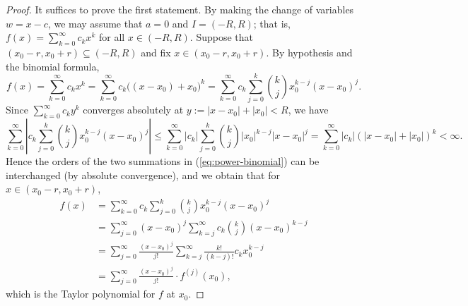 \documentclass[11pt]{article}
\begin{document}
\begin{proof}
  It suffices to prove the first statement.
  By making the change of variables $w = x - c$, we may assume that $a = 0$ and $I = (-R, R)$; that is, $\displaystyle f(x) = \sum_{k=0}^\infty c_k x^k$ for all $x \in (-R, R)$.
  Suppose that $(x_0-r, x_0+r) \subseteq (-R, R)$ and fix $x \in (x_0-r, x_0+r)$.
  By hypothesis and the binomial formula,
  \begin{equation}
    \label{eq:power-binomial}
    f(x) = \sum_{k=0}^\infty c_k x^k = \sum_{k=0}^\infty c_k \bigl( (x-x_0) + x_0 \bigr)^k = \sum_{k=0}^\infty c_k \sum_{j=0}^k \binom{k}{j} x_0^{k-j} (x-x_0)^j.
  \end{equation}
  Since $\sum_{k=0}^\infty c_k y^k$ converges absolutely at $y := |x - x_0| + |x_0| < R$, we have
  \[
    \sum_{k=0}^\infty \left| c_k \sum_{j=0}^k \binom{k}{j} x_0^{k-j} (x - x_0)^j \right| \leqslant \sum_{k=0}^\infty |c_k| \sum_{j=0}^k \binom{k}{j} |x_0|^{k-j} |x-x_0|^j = \sum_{k=0}^\infty |c_k| (|x - x_0| + |x_0|)^k < \infty.
  \]
  Hence the orders of the two summations in (\ref{eq:power-binomial}) can be interchanged (by absolute convergence), and we obtain that for $x \in (x_0-r, x_0+r)$,
  \begin{align*}
    f(x) &= \sum_{k=0}^\infty c_k \sum_{j=0}^k \binom{k}{j} x_0^{k-j} (x-x_0)^j \\
    &= \sum_{j=0}^\infty (x-x_0)^j \sum_{k=j}^\infty c_k \binom{k}{j} (x-x_0)^{k-j} \\
    &= \sum_{j=0}^\infty \frac{(x-x_0)^j}{j!} \sum_{k=j}^\infty \frac{k!}{(k-j)!} c_k x_0^{k-j} \\
    &= \sum_{j=0}^\infty \frac{(x-x_0)^j}{j!} \cdot f^{(j)}(x_0),
  \end{align*}
  which is the Taylor polynomial for $f$ at $x_0$.
\end{proof}
\end{document}
